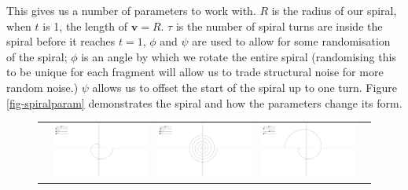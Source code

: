 This gives us a number of parameters to work with. $R$ is the radius of our spiral, when $t$ is 1, the length of $\mathbf{v}=R$. $\tau$ is the number of spiral turns are inside the spiral before it reaches $t = 1$, $\phi$ and $\psi$ are used to allow for some randomisation of the spiral; $\phi$ is an angle by which we rotate the entire spiral (randomising this to be unique for each fragment will allow us to trade structural noise for more random noise.) $\psi$ allows us to offset the start of the spiral up to one turn. Figure \ref{fig-spiralparam} demonstrates the spiral and how the parameters change its form.

\begin{figure}[!ht]
\begin{tabular} {| l | c | c | c | c |}
\hline
& 
\includegraphics[scale=0.2,trim={10cm 4.65cm 11.3cm 3.0cm},clip]{img/spiral/1turn}
&
\includegraphics[scale=0.2,trim={10cm 4.65cm 11.3cm 3.0cm},clip]{img/spiral/5turns}
&
\includegraphics[scale=0.2,trim={10cm 4.65cm 11.3cm 3.0cm},clip]{img/spiral/5internaloffset}

\end{tabular}
\end{figure}
